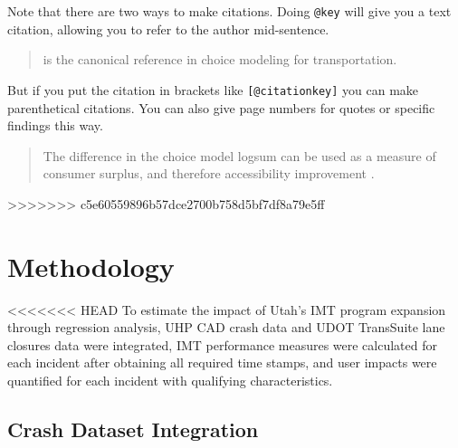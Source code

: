 \documentclass[
  letterpaper,
  authoryear]{elsarticle}
\begin{document}
Note that there are two ways to make citations. Doing \texttt{@key} will
give you a text citation, allowing you to refer to the author
mid-sentence.

\begin{quote}
\citet{ben-akivaDiscreteChoiceAnalysis1985} is the canonical reference
in choice modeling for transportation.
\end{quote}

But if you put the citation in brackets like \texttt{{[}@citationkey{]}}
you can make parenthetical citations. You can also give page numbers for
quotes or specific findings this way.

\begin{quote}
The difference in the choice model logsum can be used as a measure of
consumer surplus, and therefore accessibility improvement
\citep[p.~301]{ben-akivaDiscreteChoiceAnalysis1985}.
\end{quote}
>>>>>>> c5e60559896b57dce2700b758d5bf7df8a79e5ff


\section{Methodology}\label{methodology}

<<<<<<< HEAD
To estimate the impact of Utah's IMT program expansion through
regression analysis, UHP CAD crash data and UDOT TransSuite lane
closures data were integrated, IMT performance measures were calculated
for each incident after obtaining all required time stamps, and user
impacts were quantified for each incident with qualifying
characteristics.

\subsection{Crash Dataset Integration}\label{crash-dataset-integration}
\end{document}
